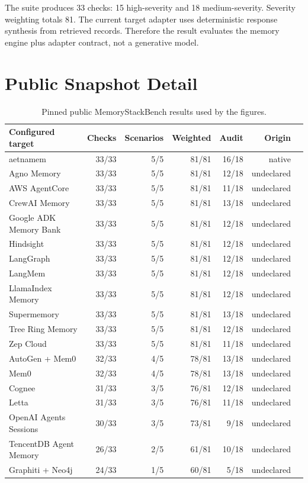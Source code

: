 The suite produces 33 checks: 15 high-severity and 18 medium-severity. Severity weighting totals 81. The current target adapter uses deterministic response synthesis from retrieved records. Therefore the result evaluates the memory engine plus adapter contract, not a generative model.

\section{Public Snapshot Detail}

\begin{table}[h]
\centering
\caption{Pinned public MemoryStackBench results used by the figures.}
\scriptsize
\begin{tabular}{@{}lrrrrrr@{}}
\toprule
Configured target & Checks & Scenarios & Weighted & Audit & Origin \\
\midrule
aetnamem & 33/33 & 5/5 & 81/81 & 16/18 & native \\
Agno Memory & 33/33 & 5/5 & 81/81 & 12/18 & undeclared \\
AWS AgentCore & 33/33 & 5/5 & 81/81 & 11/18 & undeclared \\
CrewAI Memory & 33/33 & 5/5 & 81/81 & 13/18 & undeclared \\
Google ADK Memory Bank & 33/33 & 5/5 & 81/81 & 12/18 & undeclared \\
Hindsight & 33/33 & 5/5 & 81/81 & 12/18 & undeclared \\
LangGraph & 33/33 & 5/5 & 81/81 & 12/18 & undeclared \\
LangMem & 33/33 & 5/5 & 81/81 & 12/18 & undeclared \\
LlamaIndex Memory & 33/33 & 5/5 & 81/81 & 12/18 & undeclared \\
Supermemory & 33/33 & 5/5 & 81/81 & 13/18 & undeclared \\
Tree Ring Memory & 33/33 & 5/5 & 81/81 & 12/18 & undeclared \\
Zep Cloud & 33/33 & 5/5 & 81/81 & 11/18 & undeclared \\
AutoGen + Mem0 & 32/33 & 4/5 & 78/81 & 13/18 & undeclared \\
Mem0 & 32/33 & 4/5 & 78/81 & 13/18 & undeclared \\
Cognee & 31/33 & 3/5 & 76/81 & 12/18 & undeclared \\
Letta & 31/33 & 3/5 & 76/81 & 11/18 & undeclared \\
OpenAI Agents Sessions & 30/33 & 3/5 & 73/81 & 9/18 & undeclared \\
TencentDB Agent Memory & 26/33 & 2/5 & 61/81 & 10/18 & undeclared \\
Graphiti + Neo4j & 24/33 & 1/5 & 60/81 & 5/18 & undeclared \\
\bottomrule
\end{tabular}
\end{table}


